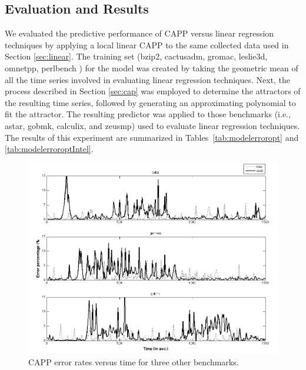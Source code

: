 \documentclass[times,10pt,finalversion]{usetex-v1}
\begin{document}
\subsection{Evaluation and Results}
\label{sec:evaluation}
We evaluated the predictive performance of CAPP versus linear regression
techniques by applying a local linear CAPP to the same collected data
used in Section \ref{sec:linear}. The training set (bzip2, cactusadm,
gromac, leslie3d, omnetpp, perlbench \cite{Spec2006}) for the model was
created by taking the geometric mean of all the time series involved in
evaluating linear regression techniques. Next, the process described in
Section \ref{sec:cap} was employed to determine the attractors of the
resulting time series, followed by generating an approximating
polynomial to fit the attractor. The resulting predictor was applied to
those benchmarks (i.e., astar, gobmk, calculix, and zeusmp) used to
evaluate linear regression techniques. The results of this experiment
are summarized in Tables~\ref{tab:modelerroropt} and \ref{tab:modelerroroptIntel}. 
{\setlength{\abovedisplayskip}{0pt plus 0pt minus 0pt}
 \setlength{\belowdisplayskip}{0pt plus 0pt minus 0pt}
\begin{figure}[!h]
  \centering
  \includegraphics[scale=0.35]{pcterr}
  \caption{CAPP error rates versus time for three other benchmarks.}
  \label{fig:pcterr}
\end{figure}}
\end{document}
